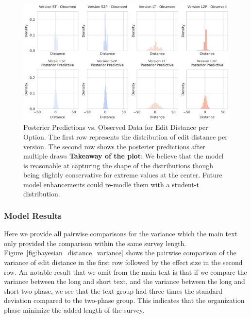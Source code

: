 \begin{figure}[h!]
    \centering
    \includegraphics[width=\textwidth]{content/image/distance/observed_vs_posterior_predictive_histogram_m2.pdf}
    \caption{Posterier Predictions vs. Observed Data for Edit Distance per Option. The first row represents the distribution of edit distance per version. The second row shows the posterier predictions after multiple draws \textbf{Takeaway of the plot}: We believe that the model is reasonable at capturing the shape of the distributions though being slightly conservative for extreme values at the center. Future model enhancements could re-modle them with a student-t distribution.}

    \label{fig:observed_vs_posterior_predictive_histogram_m2}
\end{figure}

\subsubsection{Model Results}
Here we provide all pairwise comparisons for the variance which the main text only provided the comparison within the same survey length. Figure~\ref{fig:bayesian_distance_variance} shows the pairwise comparison of the variance of edit distance in the first row followed by the effect size in the second row. An notable result that we omit from the main text is that if we compare the variance between the long and short text, and the variance between the long and short two-phase, we see that the text group had three times the standard deviation compared to the two-phase group. This indicates that the organization phase minimize the added length of the survey.

